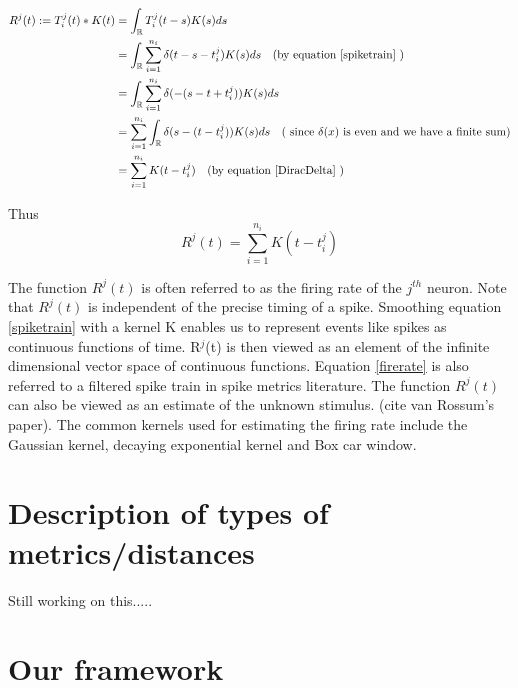 \begin{align*}
\displaystyle
R^{j}(t) := T_{i}^{j}(t)*K(t) &= \int_{\mathbb{R}} T_{i}^{j}(t-s)K(s)  ds \\
& = \int_{\mathbb{R}}    \sum_{i=1}^{n_{i}} \delta(t - s -t_{i}^{j}) K(s)  ds 
\quad (\text{by equation \ref{spiketrain}  })  \\
& =  \int_{\mathbb{R}}    \sum_{i=1}^{n_{i}} \delta( -(s - t + t_{i}^{j})) K(s)  ds\\
& =  \sum_{i=1}^{n_{i}}   \int_{\mathbb{R}} \delta(s - (t - t_{i}^{j})) K(s)  ds \quad (\text{ since $\delta(x)$ is even and we have a finite sum})\\
& = \sum_{i=1}^{n_{i}} K(t-t^{j}_{i}) \quad (\text{by equation \ref{DiracDelta} })
\end{align*}

Thus
\begin{equation} \label{firerate}
R^{j}(t) = \sum_{i=1}^{n_{i}} K(t-t^{j}_{i})
\end{equation}


The function $R^{j}(t)$ is often referred to as the firing rate of the $j^{th}$ neuron. 
Note that $R^{j}(t)$ is independent of the precise timing of a spike.
Smoothing equation \eqref{spiketrain} with a kernel K enables us to represent events like spikes as continuous functions of time. R$^{j}$(t) is then viewed as an element of the infinite dimensional vector space of continuous functions.  Equation \eqref{firerate} 
is also referred to a filtered spike train in spike metrics literature.
The function $R^{j}(t)$ can also be viewed as an estimate of the unknown stimulus.
(cite van Rossum's paper). 
The common kernels used for estimating the firing rate include the Gaussian kernel,  decaying exponential kernel and Box car window.



\section{Description of types of metrics/distances}

Still working on this.....

\section{Our framework}

